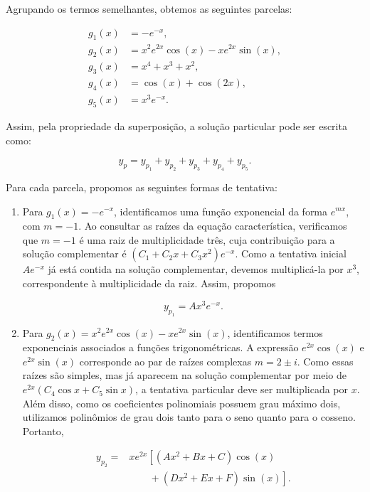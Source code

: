{  Agrupando os termos semelhantes, obtemos as seguintes parcelas:
  
  \begin{align*}
    g_1(x) &= -e^{-x}, \\
    g_2(x) &= x^2e^{2x}\cos(x)-xe^{2x}\sin(x), \\
    g_3(x) &= x^4+x^3+x^2, \\
    g_4(x) &= \cos(x)+\cos(2x), \\
    g_5(x) &= x^3e^{-x}.
  \end{align*}
  
  Assim, pela propriedade da superposição, a solução particular pode ser
  escrita como:
  
  \begin{equation*}
    y_p = y_{p_1}+y_{p_2}+y_{p_3}+y_{p_4}+y_{p_5}.
  \end{equation*}
  
  Para cada parcela, propomos as seguintes formas de tentativa:
  
  \begin{enumerate}
    \item Para $g_1(x)=-e^{-x}$, identificamos uma função exponencial da
    forma $e^{mx}$, com $m=-1$. Ao consultar as raízes da equação
    característica, verificamos que $m=-1$ é uma raiz de multiplicidade
    três, cuja contribuição para a solução complementar é
    $(C_1+C_2x+C_3x^2)e^{-x}$. Como a tentativa inicial $Ae^{-x}$
    já está contida na solução complementar, devemos multiplicá-la por
    $x^3$, correspondente à multiplicidade da raiz. Assim, propomos
  
    \begin{equation*}
      y_{p_1}=Ax^3e^{-x}.
    \end{equation*}
  
    \item Para
    $g_2(x)=x^2e^{2x}\cos(x)-xe^{2x}\sin(x)$, identificamos termos
    exponenciais associados a funções trigonométricas. A expressão
    $e^{2x}\cos(x)$ e $e^{2x}\sin(x)$ corresponde ao par de raízes
    complexas $m=2\pm i$. Como essas raízes são simples, mas já aparecem
    na solução complementar por meio de
    $e^{2x}(C_4\cos x+C_5\sin x)$, a tentativa particular deve ser
    multiplicada por $x$. Além disso, como os coeficientes polinomiais
    possuem grau máximo dois, utilizamos polinômios de grau dois tanto
    para o seno quanto para o cosseno. Portanto,
  
    \begin{equation*}
      \begin{aligned}
        y_{p_2}={}&
        x e^{2x}\left[
        (Ax^2+Bx+C)\cos(x)\right.\\
        &\left.\qquad +(Dx^2+Ex+F)\sin(x)
        \right].
      \end{aligned}
    \end{equation*}
  

\end{enumerate}}
